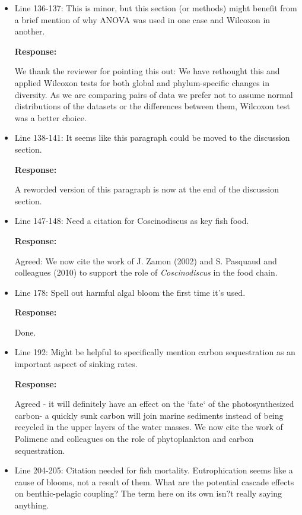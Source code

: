 \documentclass[11pt]{article}
\begin{document}
\begin{linenumbers}
\begin{itemize}
\item{Line 136-137: This is minor, but this section (or methods) might benefit from a brief mention of why ANOVA was used in one case and Wilcoxon in another.}

\textbf{Response:} 

We thank the reviewer for pointing this out: We have rethought this and applied Wilcoxon tests for both global and phylum-specific changes in diversity. As we are comparing pairs of data we prefer not to assume normal distributions of the datasets or the differences between them, Wilcoxon test was a better choice.


\item{Line 138-141: It seems like this paragraph could be moved to the discussion section.}

\textbf{Response:}

 A reworded version of this paragraph is now at the end of the discussion section.


\item{Line 147-148: Need a citation for Coscinodiscus as key fish food.}

\textbf{Response:}

 Agreed: We now cite the work of J. Zamon (2002) and S. Pasquaud and colleagues (2010) to support the role of \textit{Coscinodiscus} in the food chain.


\item{Line 178: Spell out harmful algal bloom the first time it's used.}

\textbf{Response:}

  Done.
  
\item{Line 192: Might be helpful to specifically mention carbon sequestration as an important aspect of sinking rates.}

\textbf{Response:}

 Agreed - it will definitely have an effect on the `fate` of the photosynthesized carbon- a quickly sunk carbon will join marine sediments instead of being recycled in the upper layers of the water masses. We now cite the work of Polimene and colleagues on the role of phytoplankton and carbon sequestration.

\item{Line 204-205: Citation needed for fish mortality. Eutrophication seems like a cause of blooms, not a result of them. What are the potential cascade effects on benthic-pelagic coupling? The term here on its own isn?t really saying anything.}


\end{itemize}
\end{linenumbers}
\end{document}
